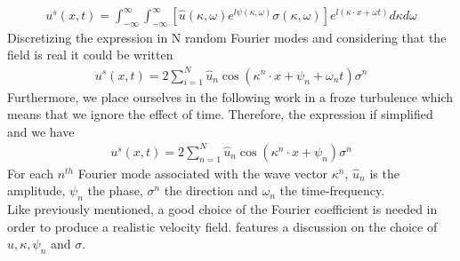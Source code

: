 \documentclass[a4paper,12pt]{article}
\begin{document}
\begin{align}
    u^s(x,t)=\int_{-\infty}^\infty\int_{-\infty}^{\infty}\left[ \hat{u}(\kappa,\omega)e^{l\psi(\kappa,\omega)}\sigma(\kappa,\omega) \right] e^{l(\kappa\cdot x + \omega t)} d\kappa d\omega
\end{align}
Discretizing the expression in N random Fourier modes and considering that the field is real it could be written 
\begin{align}
    u^s(x,t)= 2 \sum_{i=1}^N \hat{u}_n \cos(\kappa^n\cdot x + \psi_n + \omega_n t)\sigma^n
\end{align}
Furthermore, we place ourselves in the following work in a froze turbulence which means that we ignore the effect of time. Therefore, the expression if simplified and we have
\begin{align}
    u^s(x,t)= 2 \sum_{n=1}^N \hat{u}_n \cos(\kappa^n\cdot x + \psi_n)\sigma^n
\end{align}
For each $n^{th}$ Fourier mode associated with the wave vector $\kappa^n$, $\hat{u}_n$ is the amplitude, $\psi_n$ the phase, $\sigma^n$ the direction and $\omega_n$ the time-frequency. \\
Like previously mentioned, a good choice of the Fourier coefficient is needed in order to produce a realistic velocity field. \cite{Janin2021} features a discussion on the choice of $\hat{u}, \kappa, \psi_n$ and $\sigma$.
\end{document}
